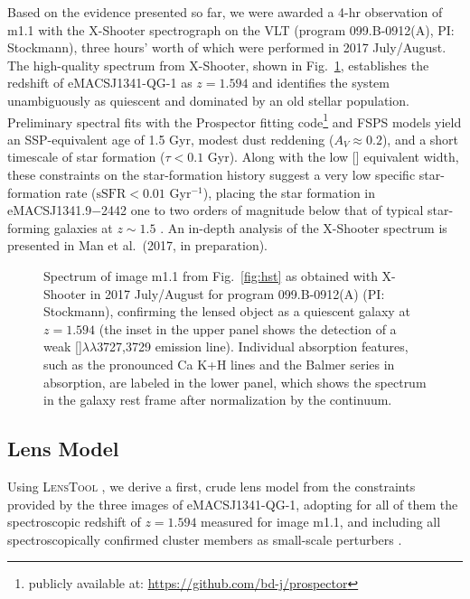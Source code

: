 \documentclass[twocolumn,times]{aastex61}
\begin{document}
Based on the evidence presented so far, we were awarded a 4-hr observation of m1.1 with the X-Shooter spectrograph on the VLT (program 099.B-0912(A), PI: Stockmann), three hours' worth of which were performed in 2017 July/August. The high-quality spectrum from X-Shooter, shown in Fig.~\ref{fig:xshooter}, establishes the redshift of eMACSJ1341-QG-1 as $z=1.594$ and identifies the system unambiguously as quiescent and dominated by an old stellar population. Preliminary spectral fits with the Prospector fitting code\footnote{publicly available at:  \url{https://github.com/bd-j/prospector}} \citep[][B.\ Johnson et al.\ 2017, in preparation]{Leja2017} and FSPS models \citep[flexible stellar population synthesis;][]{Conroy2009,Conroy2010} yield an SSP-equivalent age of 1.5 Gyr, modest dust reddening ($A_V \approx 0.2$), and a short timescale of star formation ($\tau < 0.1$ Gyr). Along with the low [] equivalent width, these constraints on the star-formation history suggest a very low specific star-formation rate ($\mathrm{sSFR}<0.01$ Gyr$^{-1}$), placing the star formation in eMACSJ1341.9$-$2442 one to two orders of magnitude below that of typical star-forming galaxies at $z\sim 1.5$ \citep[e.g.,][]{Whitaker2012}. An in-depth analysis of the X-Shooter spectrum is presented in Man et al.\ (2017, in preparation).

\begin{figure}[t]
{\caption{Spectrum of image m1.1 from Fig.~\ref{fig:hst} as obtained with X-Shooter in 2017 July/August for program 099.B-0912(A) (PI: Stockmann), confirming the lensed object as a quiescent galaxy at $z=1.594$ (the inset in the upper panel shows the detection of a weak []$\lambda\lambda$3727,3729 emission line). Individual absorption features, such as the pronounced Ca K+H lines and the Balmer series in absorption, are labeled in the lower panel, which shows the spectrum in the galaxy rest frame after normalization by the continuum.\label{fig:xshooter}}}
\end{figure}

\subsection{Lens Model}

Using \textsc{LensTool} \citep{Jullo2007}, we derive a first, crude lens model from the constraints provided by the three images of eMACSJ1341-QG-1, adopting for all of them the spectroscopic redshift of $z=1.594$ measured for image m1.1, and including all spectroscopically confirmed cluster members as small-scale perturbers \citep[for a detailed description of our modeling approach see][and references therein]{Richard2014}.
\end{document}

